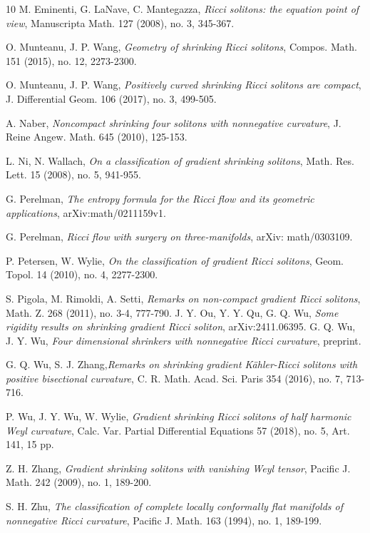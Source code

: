 \documentclass[12pt]{amsart}
\begin{document}
\begin{thebibliography}{10}
		M. Eminenti, G. LaNave, C. Mantegazza,  {\em Ricci solitons: the equation point of view}, Manuscripta Math. 127 (2008), no. 3, 345-367.
		
		
		
		
		
		
		O. Munteanu, J. P. Wang, {\em Geometry of shrinking Ricci solitons}, Compos. Math. 151 (2015), no. 12, 2273-2300.
		
		O. Munteanu, J. P. Wang, {\em Positively curved shrinking Ricci solitons are compact}, J. Differential Geom. 106 (2017), no. 3, 499-505.
		
	
		
		A. Naber, {\em  Noncompact shrinking four solitons with nonnegative curvature}, J. Reine Angew. Math. 645 (2010), 125-153.
		
		L. Ni, N. Wallach, {\em On a classification of gradient shrinking solitons}, Math. Res. Lett. 15 (2008), no. 5, 941-955.
		
		G. Perelman,  {\em The entropy formula for the Ricci flow and its geometric applications}, arXiv:math/0211159v1.
		
		G. Perelman,  {\em Ricci flow with surgery on three-manifolds}, arXiv: math/0303109.
		
 	
		
		P. Petersen, W. Wylie, {\em On the classification of gradient Ricci solitons}, Geom. Topol. 14 (2010), no. 4, 2277-2300.
		
		
		S. Pigola, M. Rimoldi, A. Setti,   {\em Remarks on non-compact gradient Ricci solitons}, Math. Z. 268 (2011), no. 3-4, 777-790.
		J. Y. Ou, Y. Y. Qu, G. Q. Wu, {\em Some rigidity results on shrinking gradient Ricci soliton}, arXiv:2411.06395.
				G. Q. Wu, J. Y. Wu, {\em Four dimensional shrinkers with nonnegative Ricci curvature}, preprint.

	
		G. Q. Wu, S. J. Zhang,{\em Remarks on shrinking gradient K\"ahler-Ricci solitons with positive bisectional curvature}, C. R. Math. Acad. Sci. Paris 354 (2016), no. 7, 713-716.
		
		P. Wu, J. Y. Wu, W. Wylie, {\em Gradient shrinking Ricci solitons of half harmonic Weyl curvature}, Calc. Var. Partial Differential Equations 57 (2018), no. 5, Art. 141, 15 pp.
		
		Z. H. Zhang, {\em Gradient shrinking solitons with vanishing Weyl tensor}, Pacific J. Math. 242 (2009), no. 1, 189-200.
		
		S. H. Zhu, {\em The classification of complete locally conformally flat manifolds of nonnegative Ricci curvature}, Pacific J. Math. 163 (1994), no. 1, 189-199.
	\end{thebibliography}
	
	
	
	
	
\end{document}
